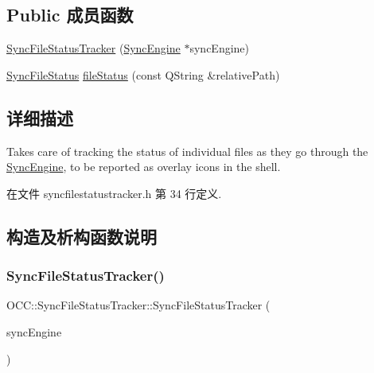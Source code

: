 \subsection*{Public 成员函数}
\begin{DoxyCompactItemize}
\item 
\hyperlink{class_o_c_c_1_1_sync_file_status_tracker_a4450c5ca65b8b807428b9437a48c2dbb}{Sync\+File\+Status\+Tracker} (\hyperlink{class_o_c_c_1_1_sync_engine}{Sync\+Engine} $\ast$sync\+Engine)
\item 
\hyperlink{class_o_c_c_1_1_sync_file_status}{Sync\+File\+Status} \hyperlink{class_o_c_c_1_1_sync_file_status_tracker_a89d86ea92cbc17fefcdfe68cfd4f5f5c}{file\+Status} (const Q\+String \&relative\+Path)
\end{DoxyCompactItemize}


\subsection{详细描述}
Takes care of tracking the status of individual files as they go through the \hyperlink{class_o_c_c_1_1_sync_engine}{Sync\+Engine}, to be reported as overlay icons in the shell. 

在文件 syncfilestatustracker.\+h 第 34 行定义.



\subsection{构造及析构函数说明}
\mbox{\label{class_o_c_c_1_1_sync_file_status_tracker_a4450c5ca65b8b807428b9437a48c2dbb}} 
\subsubsection{\texorpdfstring{Sync\+File\+Status\+Tracker()}{SyncFileStatusTracker()}}
{\footnotesize\ttfamily O\+C\+C\+::\+Sync\+File\+Status\+Tracker\+::\+Sync\+File\+Status\+Tracker (\begin{DoxyParamCaption}\item[{\hyperlink{class_o_c_c_1_1_sync_engine}{Sync\+Engine} $\ast$}]{sync\+Engine }\end{DoxyParamCaption})\hspace{0.3cm}{\ttfamily [explicit]}}



